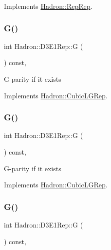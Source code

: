 Implements \mbox{\hyperlink{structHadron_1_1RepRep_a92c8802e5ed7afd7da43ccfd5b7cd92b}{Hadron\+::\+Rep\+Rep}}.

\mbox{\label{structHadron_1_1D3E1Rep_ad12460a43ef8e0c2800f64e51c4274fc}} 
\subsubsection{\texorpdfstring{G()}{G()}\hspace{0.1cm}{\footnotesize\ttfamily [1/3]}}
{\footnotesize\ttfamily int Hadron\+::\+D3\+E1\+Rep\+::G (\begin{DoxyParamCaption}{ }\end{DoxyParamCaption}) const\hspace{0.3cm}{\ttfamily [inline]}, {\ttfamily [virtual]}}

G-\/parity if it exists 

Implements \mbox{\hyperlink{structHadron_1_1CubicLGRep_ace26f7b2d55e3a668a14cb9026da5231}{Hadron\+::\+Cubic\+L\+G\+Rep}}.

\mbox{\label{structHadron_1_1D3E1Rep_ad12460a43ef8e0c2800f64e51c4274fc}} 
\subsubsection{\texorpdfstring{G()}{G()}\hspace{0.1cm}{\footnotesize\ttfamily [2/3]}}
{\footnotesize\ttfamily int Hadron\+::\+D3\+E1\+Rep\+::G (\begin{DoxyParamCaption}{ }\end{DoxyParamCaption}) const\hspace{0.3cm}{\ttfamily [inline]}, {\ttfamily [virtual]}}

G-\/parity if it exists 

Implements \mbox{\hyperlink{structHadron_1_1CubicLGRep_ace26f7b2d55e3a668a14cb9026da5231}{Hadron\+::\+Cubic\+L\+G\+Rep}}.

\mbox{\label{structHadron_1_1D3E1Rep_ad12460a43ef8e0c2800f64e51c4274fc}} 
\subsubsection{\texorpdfstring{G()}{G()}\hspace{0.1cm}{\footnotesize\ttfamily [3/3]}}
{\footnotesize\ttfamily int Hadron\+::\+D3\+E1\+Rep\+::G (\begin{DoxyParamCaption}{ }\end{DoxyParamCaption}) const\hspace{0.3cm}{\ttfamily [inline]}, {\ttfamily [virtual]}}

